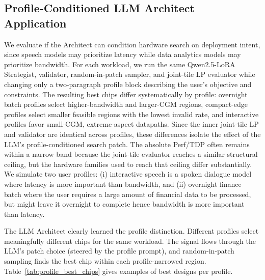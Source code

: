 \subsection{Profile-Conditioned LLM Architect Application}
\label{app:profiles}

We evaluate if the Architect can condition hardware search on deployment intent, since speech models may prioritize latency while data analytics models may prioritize bandwidth.
For each workload, we run the same Qwen2.5-LoRA Strategist, validator, random-in-patch sampler, and joint-tile LP evaluator while changing only a two-paragraph profile block describing the user’s objective and constraints.
The resulting best chips differ systematically by profile: overnight batch profiles select higher-bandwidth and larger-CGM regions, compact-edge profiles select smaller feasible regions with the lowest invalid rate, and interactive profiles favor small-CGM, extreme-aspect datapaths.
Since the inner joint-tile LP and validator are identical across profiles, these differences isolate the effect of the LLM’s profile-conditioned search patch.
The absolute Perf/TDP often remains within a narrow band because the joint-tile evaluator reaches a similar structural ceiling, but the hardware families used to reach that ceiling differ substantially.
We simulate two user profiles: (i) interactive speech is a spoken dialogue model where latency is more important than bandwidth, and (ii) overnight finance batch where the user requires a large amount of financial data to be processed, but might leave it overnight to complete hence bandwidth is more important than latency.

The LLM Architect clearly learned the profile distinction.
Different profiles select meaningfully different chips for the same workload.
The signal flows through the LLM's patch choice (steered by the profile prompt), and random-in-patch sampling finds the best chip within each profile-narrowed region.
Table~\ref{tab:profile_best_chips} gives examples of best designs per profile. 


